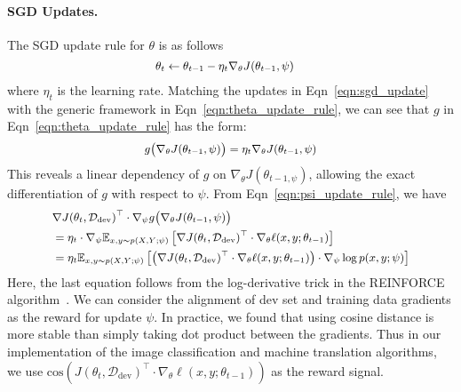 \paragraph{SGD Updates.} The SGD update rule for $\theta$ is as follows
\begin{equation}
  \label{eqn:sgd_update}
   \small
  \begin{aligned}
    \theta_t &\leftarrow \theta_{t-1} - \eta_t \nabla_\theta J(\theta_{t-1}, \psi)
  \end{aligned}
\end{equation}
where $\eta_t$ is the learning rate. Matching the updates in Eqn~\ref{eqn:sgd_update} with the generic framework in Eqn~\ref{eqn:theta_update_rule}, we can see that $g$ in Eqn~\ref{eqn:theta_update_rule} has the form: %
\begin{equation}
  \label{eqn:momentum_update_g}
   \small
  \begin{aligned}
    g\big(\nabla_\theta J(\theta_{t-1}, \psi)\big) = \eta_t \nabla_\theta J(\theta_{t-1}, \psi)
  \end{aligned}
\end{equation}
This reveals a linear dependency of $g$ on $\nabla_\theta J(\theta_{t-1, \psi})$, allowing the exact differentiation of $g$ with respect to $\psi$. From Eqn~\ref{eqn:psi_update_rule}, we have
\begin{equation}
  \label{eqn:momentum_update_for_psi}
   \small
  \begin{aligned}
    &\nabla J(\theta_t, \mathcal{D}_\text{dev})^\top \cdot \nabla_\psi g\big( \nabla_\theta J(\theta_{t-1}, \psi) \big) \\
    &= \eta_t \cdot \nabla_\psi \mathbb{E}_{x, y \sim p(X, Y; \psi)} \left[\nabla J(\theta_t, \mathcal{D}_\text{dev})^\top \cdot \nabla_\theta \ell(x, y; \theta_{t-1} )\right] \\
    &= \eta_t \mathbb{E}_{x, y \sim p(X, Y; \psi)} \left[\left(\nabla J(\theta_t, \mathcal{D}_\text{dev})^\top \cdot \nabla_\theta \ell(x, y; \theta_{t-1} ) \right) \cdot \nabla_\psi \log{p(x, y; \psi)} \right]
  \end{aligned}
\end{equation}
Here, the last equation follows from the log-derivative trick in the REINFORCE algorithm~\citep{reinforce}. We can consider the alignment of dev set and training data gradients as the reward for update $\psi$. In practice, we found that using cosine distance is more stable than simply taking dot product between the gradients. Thus in our implementation of the image classification and machine translation algorithms, we use $\text{cos}\left(J(\theta_t, \mathcal{D}_\text{dev})^\top \cdot \nabla_\theta \ell(x, y; \theta_{t-1} ) \right)$ as the reward signal.
